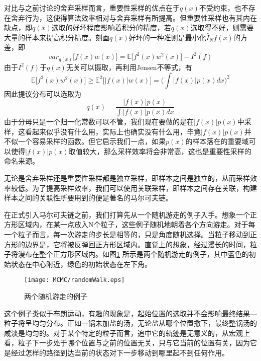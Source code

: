 对比与之前讨论的舍弃采样而言，重要性采样的优点在于$q(x)$不受约束，也不存在舍弃行为，这使得算法效率相对与舍弃采样有所提高。但重要性采样也有其内在缺点，即$q(x)$选取的好坏程度影响着积分的精度，若$q(x)$选取得不好，则需要大量的样本来提高积分精度。刻画$q(x)$好坏的一种准则是最小化$\hat{I}_N f(x)$的方差，即
\begin{equation}
var_{q(x)}\Big[f(x)w(x)\Big] = \mathbb{E}\Big[f^2(x)w^2(x)\Big] - I^2(f)
\end{equation}
由于$I^2(f)$于$q(x)$无关可以摄取，再利用Jensen不等式，有
\begin{equation}
\mathbb{E}\Big[f^2(x)w^2(x)\Big] \geq \mathbb{E}^2\Big[|f(x)|w(x)\Big] = \Big(\int |f(x)|p(x)dx\Big)^2
\end{equation}
因此提议分布可以选取为
\begin{equation}
q(x) = \frac{|f(x)|p(x)}{\int |f(x)|p(x)dx}
\end{equation}
由于分母只是一个归一化常数可以不管，我们现在要做的是在$|f(x)|p(x)$中采样，这看起来似乎没有什么用，实际上也确实没有什么用，毕竟$|f(x)|p(x)$并不似一个容易采样的函数。但它启示我们一点，如果$p(x)$的样本落在的重要域可以使得$|f(x)|p(x)$取值较大，那么采样效率将会非常高，这也是重要性采样的命名来源。

无论是舍弃采样还是重要性采样都是独立采样，即样本之间是独立的，从而采样效率较低。为了提高采样效率，我们可以使用关联采样，即样本之间存在关联，构建样本之间的关联性所要用到的便是著名的马尔可夫链。


在正式引入马尔可夫链之前，我们打算先从一个随机游走的例子入手。想象一个正方形区域内，在某一点放入N个粒子，这些例子随机地朝着各个方向游走。对于每一个粒子而言，每一次游走的步长是相等的，只是角度随机选择。当粒子移动到正方形的边界是，它将被反弹回正方形区域内。直觉上的想象，经过漫长的时间，粒子将漫布在整个正方形区域内。如图\ref{img:randomWalk} 所示是两个随机游走的例子，其中蓝色的初始状态在中心附近，绿色的初始状态在左下角。
\begin{figure}[htbp]
\centering
\texttt{[image: MCMC/randomWalk.eps]}
\caption{两个随机游走的例子}\label{img:randomWalk}
\end{figure}

这个例子类似于布朗运动，有趣的现象是，起始位置的选取并不会影响最终结果---粒子将呈均匀分布。正如一锅未加盐的汤，无论盐从哪个位置撒下，最终整锅汤的咸淡是均匀的。对于某个特定的粒子而言，追中它的轨迹是无意义的，从宏观上看，粒子下一步处于哪个位置与之前的位置无关，只与它当前的位置有关，因为它是经过怎样的路径到达当前的状态对下一步移动到哪里起不到任何作用。

